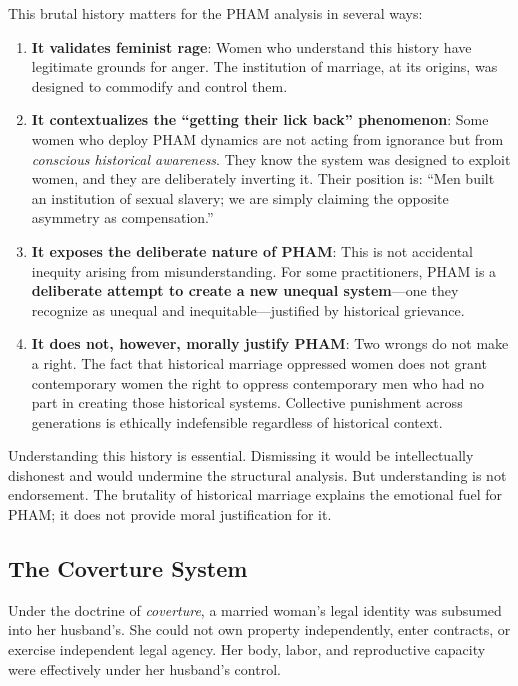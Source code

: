 \documentclass[12pt,openany]{book}
\numberwithin{equation}{chapter}
\begin{document}
This brutal history matters for the PHAM analysis in several ways:

\begin{enumerate}
    \item \textbf{It validates feminist rage}: Women who understand this history have legitimate grounds for anger. The institution of marriage, at its origins, was designed to commodify and control them.
    
    \item \textbf{It contextualizes the ``getting their lick back'' phenomenon}: Some women who deploy PHAM dynamics are not acting from ignorance but from \textit{conscious historical awareness}. They know the system was designed to exploit women, and they are deliberately inverting it. Their position is: ``Men built an institution of sexual slavery; we are simply claiming the opposite asymmetry as compensation.''
    
    \item \textbf{It exposes the deliberate nature of PHAM}: This is not accidental inequity arising from misunderstanding. For some practitioners, PHAM is a \textbf{deliberate attempt to create a new unequal system}---one they recognize as unequal and inequitable---justified by historical grievance.
    
    \item \textbf{It does not, however, morally justify PHAM}: Two wrongs do not make a right. The fact that historical marriage oppressed women does not grant contemporary women the right to oppress contemporary men who had no part in creating those historical systems. Collective punishment across generations is ethically indefensible regardless of historical context.
\end{enumerate}

Understanding this history is essential. Dismissing it would be intellectually dishonest and would undermine the structural analysis. But understanding is not endorsement. The brutality of historical marriage explains the emotional fuel for PHAM; it does not provide moral justification for it.

\subsection{The Coverture System}

Under the doctrine of \textit{coverture}, a married woman's legal identity was subsumed into her husband's. She could not own property independently, enter contracts, or exercise independent legal agency. Her body, labor, and reproductive capacity were effectively under her husband's control.
\end{document}
